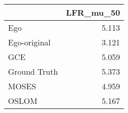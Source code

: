 \begin{tabular}{lr}
\toprule
{} & LFR_mu_50 \\
\midrule
Ego          &     5.113 \\
Ego-original &     3.121 \\
GCE          &     5.059 \\
Ground Truth &     5.373 \\
MOSES        &     4.959 \\
OSLOM        &     5.167 \\
\bottomrule
\end{tabular}
